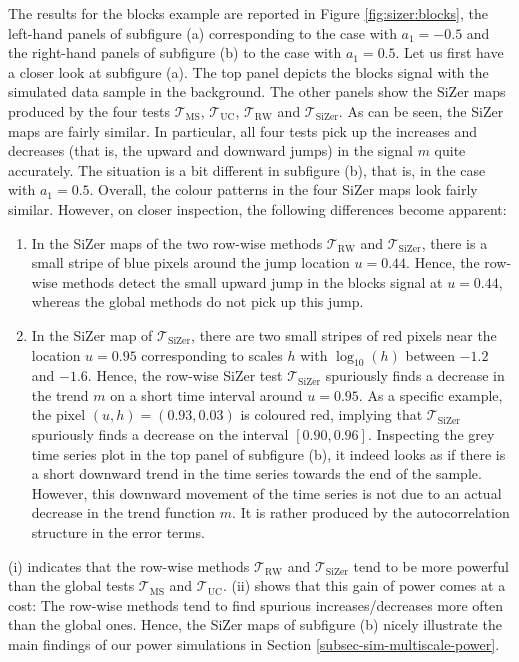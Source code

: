 The results for the blocks example are reported in Figure \ref{fig:sizer:blocks}, the left-hand panels of subfigure (a) corresponding to the case with $a_1=-0.5$ and the right-hand panels of subfigure (b) to the case with $a_1=0.5$. Let us first have a closer look at subfigure (a). The top panel depicts the blocks signal with the simulated data sample in the background. The other panels show the SiZer maps produced by the four tests $\mathcal{T}_{\text{MS}}$, $\mathcal{T}_{\text{UC}}$, $\mathcal{T}_{\text{RW}}$ and $\mathcal{T}_{\text{SiZer}}$. As can be seen, the SiZer maps are fairly similar. In particular, all four tests pick up the increases and decreases (that is, the upward and downward jumps) in the signal $m$ quite accurately. The situation is a bit different in subfigure (b), that is, in the case with $a_1=0.5$. Overall, the colour patterns in the four SiZer maps look fairly similar. However, on closer inspection, the following differences become apparent: 
\begin{enumerate}[leftmargin=0.8cm,label=(\roman*)]

\item In the SiZer maps of the two row-wise methods $\mathcal{T}_{\text{RW}}$ and $\mathcal{T}_{\text{SiZer}}$, there is a small stripe of blue pixels around the jump location $u=0.44$. Hence, the row-wise methods detect the small upward jump in the blocks signal at $u=0.44$, whereas the global methods do not pick up this jump. 

\item In the SiZer map of $\mathcal{T}_{\text{SiZer}}$, there are two small stripes of red pixels near the location $u=0.95$ corresponding to scales $h$ with $\log_{10}(h)$ between $-1.2$ and $-1.6$. Hence, the row-wise SiZer test $\mathcal{T}_{\text{SiZer}}$ spuriously finds a decrease in the trend $m$ on a short time interval around $u=0.95$. As a specific example, the pixel $(u,h) = (0.93,0.03)$ is coloured red, implying that $\mathcal{T}_{\text{SiZer}}$ spuriously finds a decrease on the interval $[0.90,0.96]$. Inspecting the grey time series plot in the top panel of subfigure (b), it indeed looks as if there is a short downward trend in the time series towards the end of the sample. However, this downward movement of the time series is not due to an actual decrease in the trend function $m$. It is rather produced by the autocorrelation structure in the error terms. 

\end{enumerate}
(i) indicates that the row-wise methods  $\mathcal{T}_{\text{RW}}$ and $\mathcal{T}_{\text{SiZer}}$ tend to be more powerful than the global tests $\mathcal{T}_{\text{MS}}$ and $\mathcal{T}_{\text{UC}}$. (ii) shows that this gain of power comes at a cost: The row-wise methods tend to find spurious increases/decreases more often than the global ones. Hence, the SiZer maps of subfigure (b) nicely illustrate the main findings of our power simulations in Section \ref{subsec-sim-multiscale-power}.


